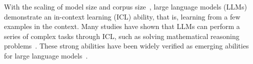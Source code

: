 
With the scaling of model size and corpus size~\citep{bert,gpt2,gpt3,chowdhery2022palm}, large language models (LLMs) demonstrate an in-context learning (ICL) ability, that is, learning from a few examples in the context. 
Many studies have shown that LLMs can perform a series of complex tasks through ICL, such as solving mathematical reasoning problems~\citep{cot}. These strong abilities have been widely verified as emerging abilities for large language models~\citep{wei2022emergent}. 


 





